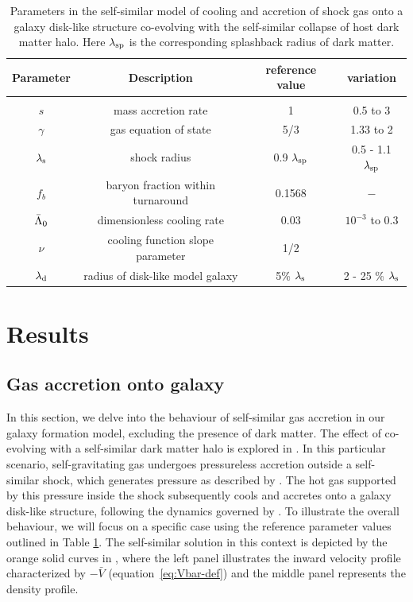\begin{table}[htbp]
\centering
\begin{tabular}{c|c|c|c}%
\hline
Parameter & Description & reference value & variation \\
\hline &&&\\
$s$ & mass accretion rate & 1 & 0.5 to 3 \\
$\gamma$ & gas equation of state & 5/3 & 1.33 to 2  \\
$\lambda_{\rm s}$ & shock radius & 0.9 $\lambda_{\rm sp}$ & 0.5 - 1.1 $\lambda_{\rm sp}$ \\
$f_b$ & baryon fraction within turnaround & 0.1568 & $-$\\
$\Bar{\Lambda}_0$ & dimensionless cooling rate & $0.03$ & $10^{-3}$ to $0.3$ \\
$\nu$ & cooling function slope parameter & 1/2 & \\
$\lambda_{\rm d}$ & radius of disk-like model galaxy & 5\% $\lambda_{\rm s}$ & 2 - 25 \% $\lambda_{\rm s}$  \\
\hline 
\end{tabular}
\caption{Parameters in the self-similar model of cooling and accretion of shock gas onto a galaxy disk-like structure co-evolving with the self-similar collapse of host dark matter halo. Here $\lambda_{\rm sp}$ is the corresponding splashback radius of dark matter.}
\label{tab:parameters-descr}
\end{table}


\section{Results}
\label{sec:results}



\subsection{Gas accretion onto galaxy}
\label{sec:results-gaso}
In this section, we delve into the behaviour of self-similar gas accretion in our galaxy formation model, excluding the presence of dark matter. The effect of co-evolving with a self-similar dark matter halo is explored in . In this particular scenario, self-gravitating gas undergoes pressureless accretion outside a self-similar shock, which generates pressure as described by . The hot gas supported by this pressure inside the shock subsequently cools and accretes onto a galaxy disk-like structure, following the dynamics governed by . To illustrate the overall behaviour, we will focus on a specific case using the reference parameter values outlined in Table \ref{tab:parameters-descr}. The self-similar solution in this context is depicted by the orange solid curves in , where the left panel illustrates the inward velocity profile characterized by $-\bar{V}$ (equation~\ref{eq:Vbar-def}) and the middle panel represents the density profile.  



